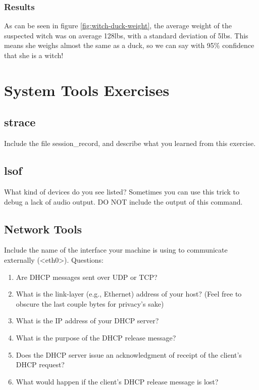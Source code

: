 \documentclass{article}
\begin{document}
\subsubsection{Results}
As can be seen in figure \ref{fig:witch-duck-weight}, the average weight of the suspected witch was on average 128lbs, with a standard deviation of 5lbs. This means she weighs almost the same as a duck, so we can say with 95\% confidence that she is a witch!

\section{System Tools Exercises}
\renewcommand{\thesubsection}{\Alph{subsection}}
\subsection{strace} 
Include the file session\_record, and describe what you learned from this exercise.
\subsection{lsof}
What kind of devices do you see listed?   Sometimes you can use this trick to debug a lack of audio output. 
DO NOT include the output of this command.
\subsection{Network Tools}
Include the name of the interface your machine is using to communicate externally (<eth0>).
Questions:
\begin{enumerate}
    \item Are DHCP messages sent over UDP or TCP? 
    \item What is the link-layer (e.g., Ethernet) address of your host? (Feel free to obscure the last couple bytes for privacy's sake)
    \item What is the IP address of your DHCP server?
    \item What is the purpose of the DHCP release message?
    \item Does the DHCP server issue an acknowledgment of receipt of the client's DHCP request?
    \item What would happen if the client's DHCP release message is lost?
\end{enumerate}
\end{document}
